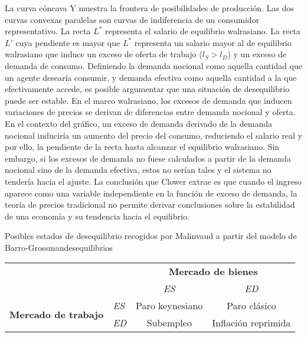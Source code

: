 \documentclass{nuevotema}
\begin{document}
La curva cóncava Y muestra la frontera de posibilidades de producción. Las dos curvas convexas paralelas son curvas de indiferencia de un consumidor representativo. La recta $L^*$ representa el salario de equilibrio walrasiano. La recta $L'$ cuya pendiente es mayor que $L^*$ representa un salario mayor al de equilibrio walrasiano que induce un exceso de oferta de trabajo ($l_S > l_D$) y un exceso de demanda de consumo. Definiendo la demanda nocional como aquella cantidad que un agente desearía consumir, y demanda efectiva como aquella cantidad a la que efectivamente accede, es posible argumentar que una situación de desequilibrio puede ser estable. En el marco walrasiano, los excesos de demanda que inducen variaciones de precios se derivan de diferencias entre demanda nocional y oferta. En el contexto del gráfico, un exceso de demanda derivado de la demanda nocional induciría un aumento del precio del consumo, reduciendo el salario real y por ello, la pendiente de la recta hasta alcanzar el equilibrio walrasiano. Sin embargo, si los excesos de demanda no fuese calculados a partir de la demanda nocional sino de la demanda efectiva, estos no serían tales y el sistema no tendería hacia el ajuste. La conclusión que Clower extrae es que cuando el ingreso aparece como una variable independiente en la función de exceso de demanda, la teoría de precios tradicional no permite derivar conclusiones sobre la estabilidad de una economía y su tendencia hacia el equilibrio.

\begin{tabla}{Posibles estados de desequilibrio recogidos por Malinvaud a partir del modelo de Barro-Grossman}{desequilibrios}
	\begin{tabular}{l l c c}
	& & \multicolumn{2}{c}{\textbf{Mercado de bienes}}\\ \cline{3-4}
	& & \textit{ES} & \textit{ED} \\ \hline
	\multirow{2}{*}{\textbf{Mercado de trabajo}} & \textit{ES} & Paro keynesiano & Paro clásico \\
	& \textit{ED} & Subempleo & Inflación reprimida \\ \hline
	\end{tabular}
\end{tabla}
\end{document}
